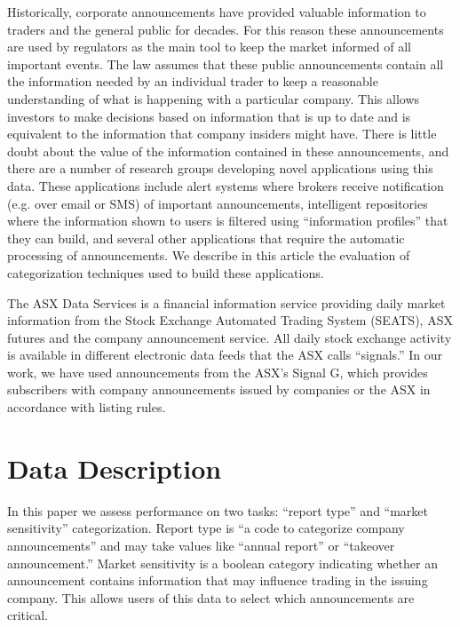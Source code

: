 \documentclass[a4paper,twocolumn]{article}
\begin{document}
Historically, corporate announcements have provided valuable
information to traders and the general public for decades. For this
reason these announcements are used by regulators as the main tool to
keep the market informed of all important events. The law assumes that
these public announcements contain all the information needed by an
individual trader to keep a reasonable understanding of what is
happening with a particular company. This allows investors to make
decisions based on information that is up to date and is equivalent to
the information that company insiders might have. There is little
doubt about the value of the information contained in these
announcements, and there are a number of research groups developing
novel applications using this data. These applications include alert
systems where brokers receive notification (e.g. over email or SMS) of
important announcements, intelligent repositories where the
information shown to users is filtered using ``information profiles''
that they can build, and several other applications that require the
automatic processing of announcements.  We describe in this article
the evaluation of categorization techniques used to build these
applications.

The ASX Data Services is a financial information service providing
daily market information from the Stock Exchange Automated Trading
System (SEATS), ASX futures and the company announcement service.  All
daily stock exchange activity is available in different electronic
data feeds that the ASX calls ``signals.''  In our work, we have used
announcements from the ASX's Signal G, which provides subscribers with
company announcements issued by companies or the ASX in accordance
with listing rules.

\section{Data Description}
\label{data}

In this paper we assess performance on two tasks: ``report type'' and
``market sensitivity'' categorization. Report type is ``a code to
categorize company announcements'' \cite{asx:02} and may take values
like ``annual report'' or ``takeover announcement.'' Market
sensitivity is a boolean category indicating whether an announcement
contains information that may influence trading in the issuing
company. This allows users of this data to select which announcements
are critical.
\end{document}
